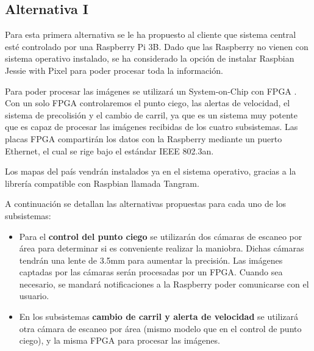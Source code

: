 \subsection{Alternativa I}

\par Para esta primera alternativa se le ha propuesto al cliente que sistema central esté controlado por una Raspberry Pi 3B. Dado que las Raspberry no vienen con sistema operativo instalado, se ha considerado la opción de instalar Raspbian Jessie with Pixel para poder procesar toda la información.
\par Para poder procesar las imágenes se utilizará un System-on-Chip con FPGA \cite{WEB:SoCFPGA}. Con un solo FPGA controlaremos el punto ciego, las alertas de velocidad, el sistema de precolisión y el cambio de carril, ya que es un sistema muy potente que es capaz de procesar las imágenes recibidas de los cuatro subsistemas. Las placas FPGA compartirán los datos con la Raspberry mediante un puerto Ethernet, el cual se rige bajo el estándar IEEE 802.3an.
\par Los mapas del país vendrán instalados ya en el sistema operativo, gracias a la librería compatible con Raspbian llamada Tangram.

\par A continuación se detallan las alternativas propuestas para cada uno de los subsistemas:

\begin{itemize}[-]
    \item Para el \textbf{control del punto ciego} se utilizarán dos cámaras de escaneo por área para determinar si es conveniente realizar la maniobra. Dichas cámaras tendrán una lente de 3.5mm para aumentar la precisión. Las imágenes captadas por las cámaras serán procesadas por un FPGA. Cuando sea necesario, se mandará notificaciones a la Raspberry poder comunicarse con el usuario.
    \item En los subsistemas \textbf{cambio de carril y alerta de velocidad} se utilizará otra cámara de escaneo por área (mismo modelo que en el control de punto ciego), y la misma FPGA para procesar las imágenes.
\end{itemize}

